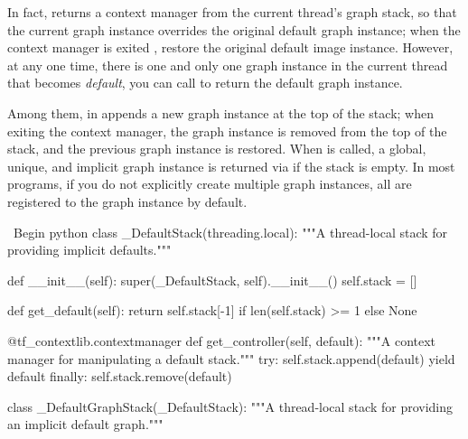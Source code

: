 \begin{content}
In fact,  returns a context manager from the current thread's graph stack, so that the current graph instance  overrides the original default graph instance; when the context manager is exited , restore the original default image instance. However, at any one time, there is one and only one graph instance in the current thread that becomes \emph{default}, you can call  to return the default graph instance.


Among them,  in  appends a new graph instance at the top of the stack; when exiting the context manager, the graph instance is removed from the top of the stack, and the previous graph instance is restored. When  is called, a global, unique, and implicit graph instance is returned via  if the stack is empty. In most \tf{} programs, if you do not explicitly create multiple graph instances, all  are registered to the graph instance by default.

\begin{leftbar}
\ Begin {python}
class _DefaultStack(threading.local):
  """A thread-local stack for providing implicit defaults."""

  def __init__(self):
    super(_DefaultStack, self).__init__()
    self.stack = []

  def get_default(self):
    return self.stack[-1] if len(self.stack) >= 1 else None

  @tf_contextlib.contextmanager
  def get_controller(self, default):
    """A context manager for manipulating a default stack."""
    try:
      self.stack.append(default)
      yield default
    finally:
      self.stack.remove(default)

class _DefaultGraphStack(_DefaultStack):
  """A thread-local stack for providing an implicit default graph."""


\end{leftbar}
\end{content}
